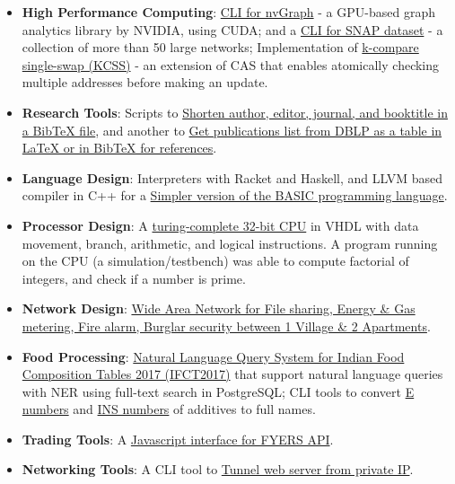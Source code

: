 \begin{itemize}[noitemsep, leftmargin=*]
  \item \textbf{High Performance Computing}:
    \href{https://github.com/nodef/nvgraph.sh}{CLI for nvGraph} - a GPU-based graph analytics library by NVIDIA, using CUDA; and a \href{https://github.com/nodef/snap-data.sh}{CLI for SNAP dataset} - a collection of more than 50 large networks; Implementation of \href{https://github.com/javaf/k-compare-single-swap}{k-compare single-swap (KCSS)} - an extension of CAS that enables atomically checking multiple addresses before making an update.
  \item \textbf{Research Tools}:
    Scripts to \href{https://github.com/javascriptf/script-minify-bibtex}{Shorten author, editor, journal, and booktitle in a BibTeX file},
    and another to \href{https://github.com/javascriptf/script-publications-list}{Get publications list from DBLP as a table in LaTeX or in BibTeX for references}.
  \item \textbf{Language Design}:
    Interpreters with Racket and Haskell, and
    LLVM based compiler in C++ for a \href{https://github.com/compilerz/basic}{Simpler version of the BASIC programming language}.
  \item \textbf{Processor Design}:
    A \href{https://github.com/vhdlf/cpu_basic}{turing-complete 32-bit CPU} in VHDL with data movement, branch, arithmetic, and logical instructions. A program running on the CPU (a simulation/testbench) was able to compute factorial of integers, and check if a number is prime.
  \item \textbf{Network Design}:
    \href{https://github.com/iiithf/wan-design}{Wide Area Network for File sharing, Energy \& Gas metering, Fire alarm, Burglar security between 1 Village \& 2 Apartments}.
  \item \textbf{Food Processing}:
    \href{https://ifct2017.github.io}{Natural Language Query System for Indian Food Composition Tables 2017 (IFCT2017)} that support natural language queries with NER using full-text search in PostgreSQL;
    CLI tools to convert \href{https://github.com/nodef/food-e}{E numbers} and \href{https://github.com/nodef/food-ins}{INS numbers} of additives to full names.
  \item \textbf{Trading Tools}:
    A \href{https://github.com/nodef/extra-fyers}{Javascript interface for FYERS API}.
  \item \textbf{Networking Tools}:
    A CLI tool to \href{https://github.com/nodef/extra-tunnel}{Tunnel web server from private IP}.

\end{itemize}
